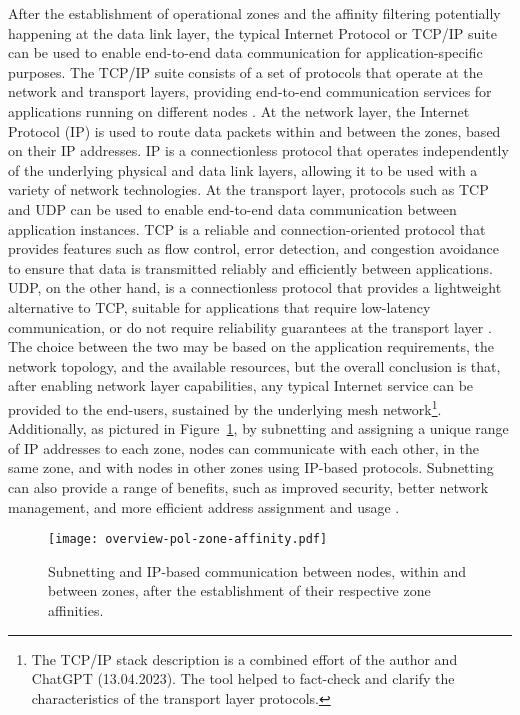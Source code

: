 After the establishment of operational zones and the affinity filtering potentially happening at the data link layer, the typical Internet Protocol or TCP/IP suite can be used to enable end-to-end data communication for application-specific purposes. The TCP/IP suite consists of a set of protocols that operate at the network and transport layers, providing end-to-end communication services for applications running on different nodes \cite{peterson2007computer}. At the network layer, the Internet Protocol (IP) is used to route data packets within and between the zones, based on their IP addresses. IP is a connectionless protocol that operates independently of the underlying physical and data link layers, allowing it to be used with a variety of network technologies. At the transport layer, protocols such as TCP and UDP can be used to enable end-to-end data communication between application instances. TCP is a reliable and connection-oriented protocol that provides features such as flow control, error detection, and congestion avoidance to ensure that data is transmitted reliably and efficiently between applications. UDP, on the other hand, is a connectionless protocol that provides a lightweight alternative to TCP, suitable for applications that require low-latency communication, or do not require reliability guarantees at the transport layer \cite{peterson2007computer}. The choice between the two may be based on the application requirements, the network topology, and the available resources, but the overall conclusion is that, after enabling network layer capabilities, any typical Internet service can be provided to the end-users, sustained by the underlying mesh network\footnote{The TCP/IP stack description is a combined effort of the author and ChatGPT (13.04.2023). The tool helped to fact-check and clarify the characteristics of the transport layer protocols.}. Additionally, as pictured in Figure~\ref{fig:proof-of-location-overview-pol-zone-affinity}, by subnetting and assigning a unique range of IP addresses to each zone, nodes can communicate with each other, in the same zone, and with nodes in other zones using IP-based protocols. Subnetting can also provide a range of benefits, such as improved security, better network management, and more efficient address assignment and usage \cite{peterson2007computer}.

\begin{figure}[h!]
    \begin{center}
    \texttt{[image: overview-pol-zone-affinity.pdf]}
    \caption{Subnetting and IP-based communication between nodes, within and between zones, after the establishment of their respective zone affinities.}
    \label{fig:proof-of-location-overview-pol-zone-affinity}
    \end{center}
\end{figure}

